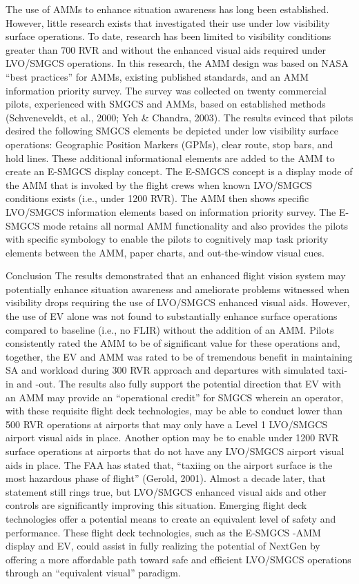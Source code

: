 \documentclass[utf8,bachelor,manualbib]{gradu3}
\begin{document}
The use of AMMs to enhance situation awareness has long been established. However, little research exists that
investigated their use under low visibility surface operations. To date, research has been limited to visibility
conditions greater than 700 RVR and without the enhanced visual aids required under LVO/SMGCS operations.
In this research, the AMM design was based on NASA “best practices” for AMMs, existing published standards,
and an AMM information priority survey. The survey was collected on twenty commercial pilots, experienced with
SMGCS and AMMs, based on established methods (Schveneveldt, et al., 2000; Yeh \& Chandra, 2003). The results
evinced that pilots desired the following SMGCS elements be depicted under low visibility surface operations: Geographic Position Markers (GPMs), clear route, stop bars, and hold lines. These additional informational elements are added to the AMM to create an E-SMGCS display concept.
The E-SMGCS concept is a display mode of the AMM that is invoked by the flight crews when known LVO/SMGCS conditions exists (i.e., under 1200 RVR). The AMM then shows specific LVO/SMGCS information elements based on information priority survey. The E-SMGCS mode retains all normal AMM functionality and also provides the pilots with specific symbology to enable the pilots to cognitively map task priority elements between the AMM, paper charts, and out-the-window visual cues.

Conclusion
The results demonstrated that an enhanced flight vision system may potentially enhance situation awareness and ameliorate problems witnessed when visibility drops requiring the use of LVO/SMGCS enhanced visual aids. However, the use of EV alone was not found to substantially enhance surface operations compared to baseline (i.e., no FLIR) without the addition of an AMM. Pilots consistently rated the AMM to be of significant value for these operations and, together, the EV and AMM was rated to be of tremendous benefit in maintaining SA and workload during 300 RVR approach and departures with simulated taxi-in and -out. The results also fully support the potential direction that EV with an AMM may provide an “operational credit” for SMGCS wherein an operator, with these requisite flight deck technologies, may be able to conduct lower than 500 RVR operations at airports that may only have a Level 1 LVO/SMGCS airport visual aids in place. Another option may be to enable under 1200 RVR surface operations at airports that do not have any LVO/SMGCS airport visual aids in place.
The FAA has stated that, “taxiing on the airport surface is the most hazardous phase of flight” (Gerold, 2001). Almost a decade later, that statement still rings true, but LVO/SMGCS enhanced visual aids and other controls are significantly improving this situation. Emerging flight deck technologies offer a potential means to create an equivalent level of safety and performance. These flight deck technologies, such as the E-SMGCS -AMM display and EV, could assist in fully realizing the potential of NextGen by offering a more affordable path toward safe and efficient LVO/SMGCS operations through an “equivalent visual” paradigm. \citep{prinzel2013}
\end{document}
